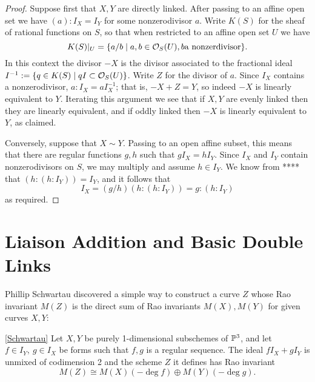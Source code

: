 \begin{proof} Suppose first that $X,Y$ are directly linked. After passing to an affine open set we have
$(a):I_X = I_Y$ for some nonzerodivisor $a$. Write $K(S)$ for the sheaf of rational functions on $S$, so that
when restricted to an affine open set $U$ we have 
$$
K(S)|_U = \{a/b\mid a,b \in {\mathcal O}_S(U), b \hbox{a nonzerdivisor}\}.
$$  
In this context the divisor $-X$ is the divisor associated to the
fractional ideal $I^{-1} := \{q\in K(S) \mid qI \subset {\mathcal O}_S(U)\}$.
Write $Z$ for the divisor of $a$. Since $I_X$ contains a nonzerodivisor, $a:I_X = aI_X^{-1}$; that is,
$-X+Z = Y$, so indeed $-X$ is linearly equivalent to $Y$. Iterating this argument we see that if $X,Y$ are evenly linked then
they are linearly equivalent, and if oddly linked then $-X$ is linearly equivalent to $Y$, as claimed.

Conversely, suppose that $X \sim Y$. Passing to an open affine subset, this means that there are regular functions $g,h$
such that $gI_X = hI_Y$. Since $I_X$ and $I_Y$ contain nonzerodivisors on $S$, we may multiply and assume $h\in I_Y$.
We know from **** that $(h:(h:I_Y)) = I_Y$, and it follows that 
$$
I_X = (g/h)(h:(h:I_Y))= g:(h:I_Y)
$$
as required.
\end{proof}

\section{Liaison Addition and Basic Double Links}

Phillip Schwartau discovered a simple way to construct a curve $Z$ whose Rao invariant $M(Z)$ is the direct sum of Rao 
invariants $M(X), M(Y)$ for given curves $X,Y$:

\begin{proposition}\ref{Schwartau}\label{Schwartau}
 Let $X,Y$ be purely 1-dimensional subschemes of ${\mathbb P}^3$, and let $f\in I_Y,\ g\in I_X$ be forms such that $f,g$ is a regular
 sequence. The ideal $fI_X+gI_Y$ is unmixed of codimension 2 and the scheme $Z$ it defines has Rao invariant
 $$
 M(Z) \cong M(X)(-\deg f)\oplus M(Y)(-\deg g).
 $$
\end{proposition}

